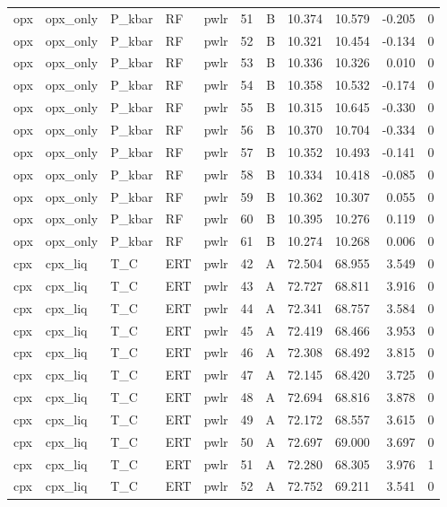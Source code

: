 \begin{longtable}{lllllrrrrrr}
opx & opx\_only & P\_kbar & RF & pwlr & 51 & B & 10.374 & 10.579 & -0.205 & 0 \\
opx & opx\_only & P\_kbar & RF & pwlr & 52 & B & 10.321 & 10.454 & -0.134 & 0 \\
opx & opx\_only & P\_kbar & RF & pwlr & 53 & B & 10.336 & 10.326 & 0.010 & 0 \\
opx & opx\_only & P\_kbar & RF & pwlr & 54 & B & 10.358 & 10.532 & -0.174 & 0 \\
opx & opx\_only & P\_kbar & RF & pwlr & 55 & B & 10.315 & 10.645 & -0.330 & 0 \\
opx & opx\_only & P\_kbar & RF & pwlr & 56 & B & 10.370 & 10.704 & -0.334 & 0 \\
opx & opx\_only & P\_kbar & RF & pwlr & 57 & B & 10.352 & 10.493 & -0.141 & 0 \\
opx & opx\_only & P\_kbar & RF & pwlr & 58 & B & 10.334 & 10.418 & -0.085 & 0 \\
opx & opx\_only & P\_kbar & RF & pwlr & 59 & B & 10.362 & 10.307 & 0.055 & 0 \\
opx & opx\_only & P\_kbar & RF & pwlr & 60 & B & 10.395 & 10.276 & 0.119 & 0 \\
opx & opx\_only & P\_kbar & RF & pwlr & 61 & B & 10.274 & 10.268 & 0.006 & 0 \\
cpx & cpx\_liq & T\_C & ERT & pwlr & 42 & A & 72.504 & 68.955 & 3.549 & 0 \\
cpx & cpx\_liq & T\_C & ERT & pwlr & 43 & A & 72.727 & 68.811 & 3.916 & 0 \\
cpx & cpx\_liq & T\_C & ERT & pwlr & 44 & A & 72.341 & 68.757 & 3.584 & 0 \\
cpx & cpx\_liq & T\_C & ERT & pwlr & 45 & A & 72.419 & 68.466 & 3.953 & 0 \\
cpx & cpx\_liq & T\_C & ERT & pwlr & 46 & A & 72.308 & 68.492 & 3.815 & 0 \\
cpx & cpx\_liq & T\_C & ERT & pwlr & 47 & A & 72.145 & 68.420 & 3.725 & 0 \\
cpx & cpx\_liq & T\_C & ERT & pwlr & 48 & A & 72.694 & 68.816 & 3.878 & 0 \\
cpx & cpx\_liq & T\_C & ERT & pwlr & 49 & A & 72.172 & 68.557 & 3.615 & 0 \\
cpx & cpx\_liq & T\_C & ERT & pwlr & 50 & A & 72.697 & 69.000 & 3.697 & 0 \\
cpx & cpx\_liq & T\_C & ERT & pwlr & 51 & A & 72.280 & 68.305 & 3.976 & 1 \\
cpx & cpx\_liq & T\_C & ERT & pwlr & 52 & A & 72.752 & 69.211 & 3.541 & 0 \\

\end{longtable}
